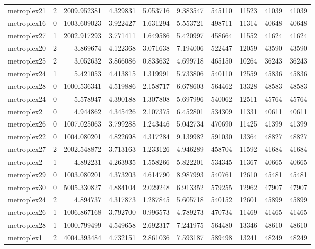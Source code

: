 \begin{longtable}{|l|r|r|r|r|r|r|r|r|r|}
metroplex21 & 2 & 2009.952381 & 4.329831 & 5.053716 & 9.383547 & 545110 & 11523 & 41039 & 41039 \\
metroplex16 & 0 & 1003.609023 & 3.922427 & 1.631294 & 5.553721 & 498711 & 11314 & 40648 & 40648 \\
metroplex27 & 1 & 2002.917293 & 3.771411 & 1.649586 & 5.420997 & 458664 & 11552 & 41624 & 41624 \\
metroplex20 & 2 & 3.869674 & 4.122368 & 3.071638 & 7.194006 & 522447 & 12059 & 43590 & 43590 \\
metroplex25 & 2 & 3.052632 & 3.866086 & 0.833632 & 4.699718 & 465150 & 10264 & 36243 & 36243 \\
metroplex24 & 1 & 5.421053 & 4.413815 & 1.319991 & 5.733806 & 540110 & 12559 & 45836 & 45836 \\
metroplex28 & 0 & 1000.536341 & 4.519886 & 2.158717 & 6.678603 & 564462 & 13328 & 48583 & 48583 \\
metroplex24 & 0 & 5.578947 & 4.390188 & 1.307808 & 5.697996 & 540062 & 12511 & 45764 & 45764 \\
metroplex2 & 0 & 4.944862 & 4.345426 & 2.107375 & 6.452801 & 534309 & 11331 & 40611 & 40611 \\
metroplex26 & 0 & 1007.025063 & 3.799288 & 1.243446 & 5.042734 & 470690 & 11425 & 41399 & 41399 \\
metroplex22 & 0 & 1004.080201 & 4.822698 & 4.317284 & 9.139982 & 591030 & 13364 & 48827 & 48827 \\
metroplex27 & 2 & 2002.548872 & 3.713163 & 1.233126 & 4.946289 & 458704 & 11592 & 41684 & 41684 \\
metroplex2 & 1 & 4.892231 & 4.263935 & 1.558266 & 5.822201 & 534345 & 11367 & 40665 & 40665 \\
metroplex29 & 0 & 1003.080201 & 4.373203 & 4.614790 & 8.987993 & 540761 & 12610 & 45481 & 45481 \\
metroplex30 & 0 & 5005.330827 & 4.884104 & 2.029248 & 6.913352 & 579255 & 12962 & 47907 & 47907 \\
metroplex24 & 2 & 4.894737 & 4.317873 & 1.287845 & 5.605718 & 540152 & 12601 & 45899 & 45899 \\
metroplex26 & 1 & 1006.867168 & 3.792700 & 0.996573 & 4.789273 & 470734 & 11469 & 41465 & 41465 \\
metroplex28 & 1 & 1000.799499 & 4.549658 & 2.692317 & 7.241975 & 564480 & 13346 & 48610 & 48610 \\
metroplex1 & 2 & 4004.393484 & 4.732151 & 2.861036 & 7.593187 & 589498 & 13241 & 48249 & 48249 \\

\end{longtable}
